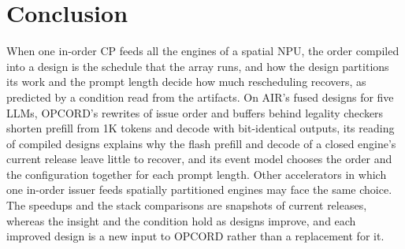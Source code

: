 \section{Conclusion}
\label{sec:conclusion}

When one in-order CP feeds all the engines of a spatial NPU, the order compiled into a design is the schedule that the array runs, and how the design partitions its work and the prompt length decide how much rescheduling recovers, as predicted by a condition read from the artifacts.
On AIR's fused designs for five LLMs, OPCORD's rewrites of issue order and buffers behind legality checkers shorten prefill from 1K tokens and decode with bit-identical outputs, its reading of compiled designs explains why the flash prefill and decode of a closed engine's current release leave little to recover, and its event model chooses the order and the configuration together for each prompt length.
Other accelerators in which one in-order issuer feeds spatially partitioned engines may face the same choice.
The speedups and the stack comparisons are snapshots of current releases, whereas the insight and the condition hold as designs improve, and each improved design is a new input to OPCORD rather than a replacement for it.
